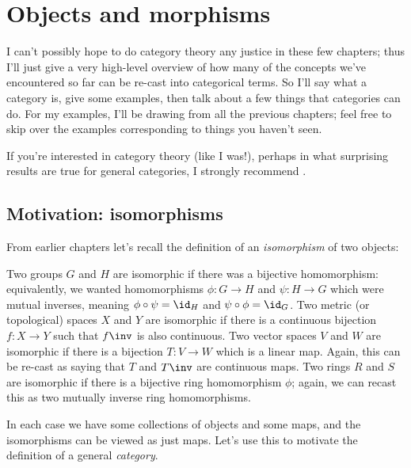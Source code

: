 \chapter{Objects and morphisms}
\label{ch:cats}
I can't possibly hope to do category theory any justice in these few chapters;
thus I'll just give a very high-level overview of how many of the concepts we've
encountered so far can be re-cast into categorical terms.
So I'll say what a category is, give some examples,
then talk about a few things that categories can do.
For my examples, I'll be drawing from all the previous chapters;
feel free to skip over the examples corresponding to things you haven't seen.

If you're interested in category theory (like I was!), perhaps in
what surprising results are true for general categories, I strongly recommend \cite{ref:msci}.

\section{Motivation: isomorphisms}
From earlier chapters let's recall the definition of an \emph{isomorphism} of two objects:
\begin{itemize}
	\ii Two groups $G$ and $H$ are isomorphic if there was a bijective homomorphism:
	equivalently, we wanted homomorphisms $\phi : G \to H$ and $\psi : H \to G$
	which were mutual inverses, meaning $\phi \circ \psi = \id_H$ and $\psi \circ \phi = \id_G$.
	\ii Two metric (or topological) spaces $X$ and $Y$ are isomorphic
	if there is a continuous bijection $f : X \to Y$ such that $f\inv$ is also continuous.
	\ii Two vector spaces $V$ and $W$ are isomorphic if there is a bijection $T : V \to W$
	which is a linear map.
	Again, this can be re-cast as saying that $T$ and $T\inv$ are continuous maps.
	\ii Two rings $R$ and $S$ are isomorphic if there is a bijective ring homomorphism $\phi$;
	again, we can recast this as two mutually inverse ring homomorphisms.
\end{itemize}

In each case we have some collections of objects and some maps,
and the isomorphisms can be viewed as just maps.
Let's use this to motivate the definition of a general \emph{category}.

